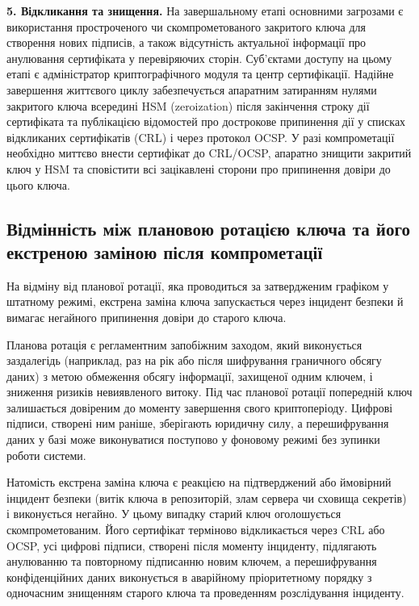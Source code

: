 \textbf{5. Відкликання та знищення.}
На завершальному етапі основними загрозами є використання простроченого чи скомпрометованого
закритого ключа для створення нових підписів, а також відсутність актуальної інформації про анулювання
сертифіката у перевіряючих сторін. Суб'єктами доступу на цьому етапі є адміністратор криптографічного
модуля та центр сертифікації. Надійне завершення життєвого циклу забезпечується апаратним затиранням
нулями закритого ключа всередині HSM (zeroization) після закінчення строку дії сертифіката та публікацією
відомостей про дострокове припинення дії у списках відкликаних сертифікатів (CRL) і через протокол OCSP. У
разі компрометації необхідно миттєво внести сертифікат до CRL/OCSP, апаратно знищити закритий ключ у
HSM та сповістити всі зацікавлені сторони про припинення довіри до цього ключа.


\subsection{Відмінність між плановою ротацією ключа та його екстреною заміною після компрометації}

На відміну від планової ротації, яка проводиться за затвердженим графіком у штатному режимі, екстрена
заміна ключа запускається через інцидент безпеки й вимагає негайного припинення довіри до старого ключа.

Планова ротація є регламентним запобіжним заходом, який виконується заздалегідь (наприклад, раз на рік
або після шифрування граничного обсягу даних) з метою обмеження обсягу інформації, захищеної одним
ключем, і зниження ризиків невиявленого витоку. Під час планової ротації попередній ключ залишається
довіреним до моменту завершення свого криптоперіоду. Цифрові підписи, створені ним раніше, зберігають
юридичну силу, а перешифрування даних у базі може виконуватися поступово у фоновому режимі без
зупинки роботи системи.

Натомість екстрена заміна ключа є реакцією на підтверджений або ймовірний інцидент безпеки (витік ключа
в репозиторій, злам сервера чи сховища секретів) і виконується негайно. У цьому випадку старий ключ
оголошується скомпрометованим. Його сертифікат терміново відкликається через CRL або OCSP, усі цифрові
підписи, створені після моменту інциденту, підлягають анулюванню та повторному підписанню новим
ключем, а перешифрування конфіденційних даних виконується в аварійному пріоритетному порядку з
одночасним знищенням старого ключа та проведенням розслідування інциденту.
